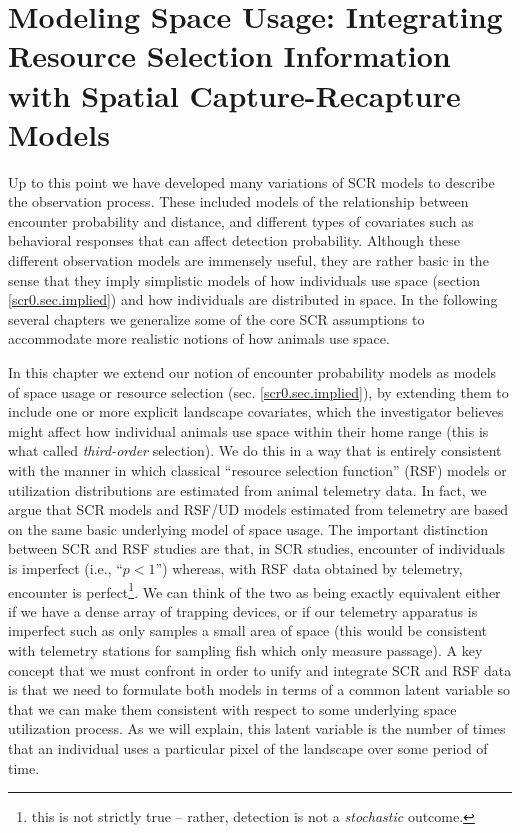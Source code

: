 \chapter{
Modeling Space Usage:
Integrating Resource Selection Information with
Spatial Capture-Recapture
  Models}

\label{chapt.rsf}


\vspace{.3in}

Up to this point we have developed many variations of SCR models to
describe the observation process.  These included models of the
relationship between encounter probability and distance, and different
types of covariates such as behavioral responses that can affect
detection probability.  Although these different observation models
are immensely useful, they are rather basic in the sense that they
imply simplistic models of how individuals use space (section
\ref{scr0.sec.implied}) and how individuals are distributed in space.
In the following several chapters we generalize some of the core SCR
assumptions to accommodate more realistic notions of how animals use
space.

In this chapter we extend our notion of encounter probability models
as models of space usage or resource selection
(sec. \ref{scr0.sec.implied}), by extending them to include one or
more explicit landscape covariates, which the investigator believes
might affect how individual animals use space within their home range
(this is what \citep{johnson:1980} called {\it third-order}
selection). We do this in a way that is entirely consistent with the
manner in which classical ``resource selection function'' (RSF) models
\citep{manly_etal:2002} or utilization distributions
\citep{worton:1989, fieberg:2005, fieberg:2007} are estimated from
animal telemetry data.  In fact, we argue that SCR models and
RSF/UD models estimated from telemetry are based on the same basic
underlying model of space usage. The important distinction between SCR
and RSF studies are that, in SCR studies, encounter of individuals is
imperfect (i.e., ``$p<1$'') whereas, with RSF data obtained by
telemetry, encounter is perfect\footnote{this is not strictly true --
  rather, detection is not a {\it stochastic} outcome.}. We can think
of the two as being exactly equivalent either if we have a dense array
of trapping devices, or if our telemetry apparatus is imperfect such
as only samples a small area of space (this would be consistent with
telemetry stations for sampling fish which only measure passage).
A
key concept that we must confront in order to unify and integrate SCR
and RSF data is that we need to formulate both models in terms of a
common latent variable so that we can make them consistent with
respect to some underlying space utilization process. As we will
explain, this latent variable is the number of times that an
individual uses a particular pixel of the landscape over some period
of time.

